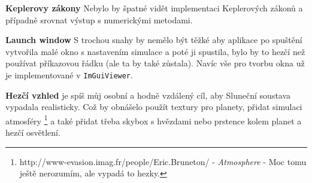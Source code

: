 \begin{description}
	\item \textbf{Keplerovy zákony}
	Nebylo by špatné vidět implementaci Keplerových zákonů a případně srovnat výstup s numerickými metodami.
	\item \textbf{Launch window} S trochou snahy by nemělo být těžké aby aplikace po spuštění vytvořila malé okno s nastavením simulace a poté ji spustila, bylo by to hezčí než používat příkazovou řádku (ale ta by také zůstala). Navíc vše pro tvorbu okna už je implementované v \texttt{ImGuiViewer}.
	\item \textbf{Hezčí vzhled} je spíš můj osobní a hodně vzdálený cíl, aby Sluneční soustava vypadala realisticky. Což by obnášelo použít textury pro planety, přidat simulaci atmosféry \footnote{ http://www-evasion.imag.fr/people/Eric.Bruneton/  - \textit{Atmosphere} - Moc tomu ještě nerozumím, ale vypadá to hezky.} a také přidat třeba skybox s hvězdami nebo prstence kolem planet a hezčí osvětlení.
\end{description}


